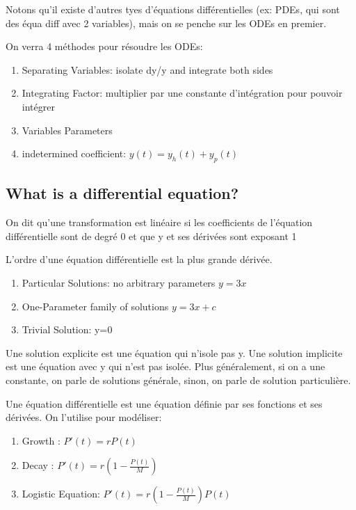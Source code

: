 \documentclass{article}
\begin{document}
Notons qu'il existe d'autres tyes d'équations différentielles (ex:
PDEs, qui sont des équa diff avec 2 variables), mais on se penche sur les
ODEs en premier.

On verra 4 méthodes pour résoudre les ODEs:
\begin{enumerate}
    \item Separating Variables: isolate dy/y and integrate both sides
    \item Integrating Factor: multiplier par une constante d'intégration
	pour pouvoir intégrer
    \item Variables Parameters
    \item indetermined coefficient: $ y(t) = y_h(t) + y_p(t) $

\end{enumerate}

\subsection{What is a differential equation? }

\begin{definition}
    On dit qu'une transformation est linéaire si les coefficients de
    l'équation différentielle sont de degré 0 et que y et ses dérivées
    sont exposant 1
\end{definition}

\begin{definition}
    L'ordre d'une équation différentielle est la plus grande dérivée.
\end{definition}

\begin{definition}
    \begin{enumerate}
        \item Particular Solutions: no arbitrary parameters $ y = 3x$
	\item One-Parameter family of solutions $ y=3x+c$
	\item Trivial Solution: y=0
    \end{enumerate}
    Une solution explicite est une équation qui n'isole pas y. Une solution
    implicite est une équation avec y qui n'est pas isolée.
    Plus généralement, si on a une constante, on parle de solutions
    générale, sinon, on parle de solution particulière.
\end{definition}

Une équation différentielle est une équation définie par ses fonctions
et ses dérivées. On l'utilise pour modéliser:
\begin{enumerate}
    \item Growth : $ P'(t) = r P(t)$
    \item Decay : $ P'(t) = r (1- \frac{P(t)}{M})$
    \item Logistic Equation: $ P'(t) = r (1- \frac{P(t)}{M})P(t)$
\end{enumerate}
\end{document}
